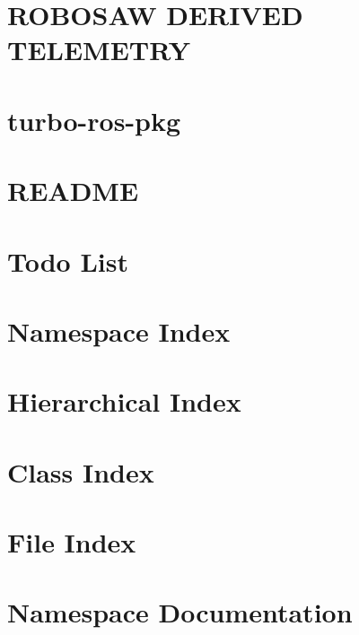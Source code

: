 \let\mypdfximage\pdfximage\def\pdfximage{\immediate\mypdfximage}\documentclass[twoside]{book}
\newcommand{\+}{\discretionary{\mbox{\scriptsize$\hookleftarrow$}}{}{}}
\begin{document}
\chapter{R\+O\+B\+O\+S\+AW D\+E\+R\+I\+V\+ED T\+E\+L\+E\+M\+E\+T\+RY}
\label{autotoc_md32}

\chapter{turbo-\/ros-\/pkg}
\label{md__home_offworld5__off_world__code_swarm-robotic-mining_catkin_ws_src_offworld-turbo-ros-pkg__r_e_a_d_m_e}

\chapter{R\+E\+A\+D\+ME}
\label{md__home_offworld5__off_world__code_swarm-robotic-mining_catkin_ws_src_offworld_agni_tf_tools__r_e_a_d_m_e}

\chapter{Todo List}
\label{todo}

\chapter{Namespace Index}

\chapter{Hierarchical Index}

\chapter{Class Index}

\chapter{File Index}

\chapter{Namespace Documentation}







\end{document}
